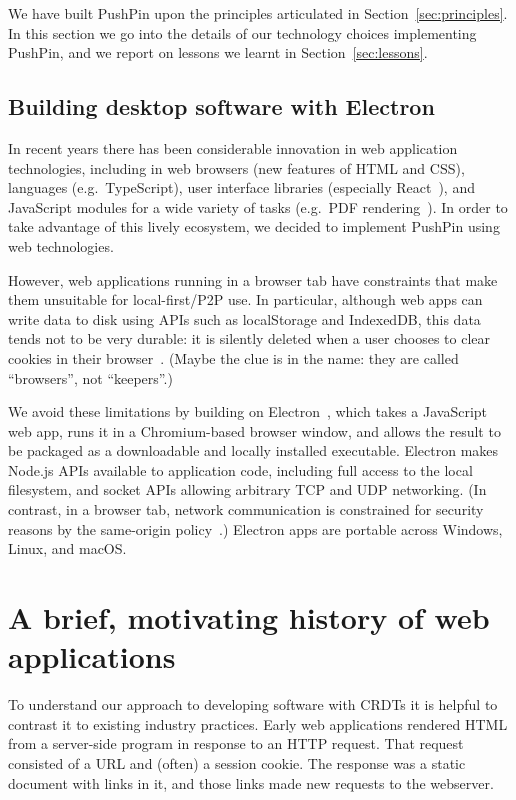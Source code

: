 \documentclass[sigplan,10pt]{acmart}
\begin{document}
We have built PushPin upon the principles articulated in Section~\ref{sec:principles}.
In this section we go into the details of our technology choices implementing PushPin, and we report on lessons we learnt in Section~\ref{sec:lessons}.

\subsection{Building desktop software with Electron}

In recent years there has been considerable innovation in web application technologies, including in web browsers (new features of HTML and CSS), languages (e.g.\ TypeScript), user interface libraries (especially React~\cite{React}), and JavaScript modules for a wide variety of tasks (e.g.\ PDF rendering~\cite{PDFjs}).
In order to take advantage of this lively ecosystem, we decided to implement PushPin using web technologies.

However, web applications running in a browser tab have constraints that make them unsuitable for local-first/P2P use.
In particular, although web apps can write data to disk using APIs such as localStorage and IndexedDB, this data tends not to be very durable: it is silently deleted when a user chooses to clear cookies in their browser~\cite{LocalStorageCleared}.
(Maybe the clue is in the name: they are called ``browsers'', not ``keepers''.)

We avoid these limitations by building on Electron~\cite{Electron}, which takes a JavaScript web app, runs it in a Chromium-based browser window, and allows the result to be packaged as a downloadable and locally installed executable.
Electron makes Node.js APIs available to application code, including full access to the local filesystem, and socket APIs allowing arbitrary TCP and UDP networking.
(In contrast, in a browser tab, network communication is constrained for security reasons by the same-origin policy~\cite{SameOrigin}.)
Electron apps are portable across Windows, Linux, and macOS.

\section{A brief, motivating history of web applications}

To understand our approach to developing software with CRDTs it is helpful to contrast it to existing industry practices. Early web applications rendered HTML from a server-side program in response to an HTTP request. That request consisted of a URL and (often) a session cookie. The response was a static document with links in it, and those links made new requests to the webserver.
\end{document}
